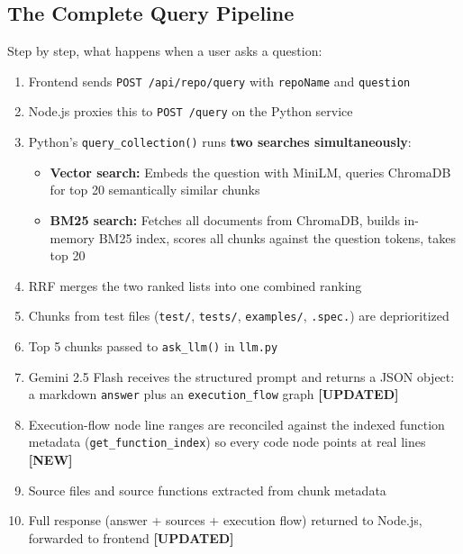 \documentclass[a4paper,11pt]{article}
\begin{document}
\subsection{The Complete Query Pipeline}

Step by step, what happens when a user asks a question:

\begin{enumerate}
    \item Frontend sends \texttt{POST /api/repo/query} with \texttt{repoName} and \texttt{question}
    \item Node.js proxies this to \texttt{POST /query} on the Python service
    \item Python's \texttt{query\_collection()} runs \textbf{two searches simultaneously}:
    \begin{itemize}
        \item \textbf{Vector search:} Embeds the question with MiniLM, queries ChromaDB for top 20 semantically similar chunks
        \item \textbf{BM25 search:} Fetches all documents from ChromaDB, builds in-memory BM25 index, scores all chunks against the question tokens, takes top 20
    \end{itemize}
    \item RRF merges the two ranked lists into one combined ranking
    \item Chunks from test files (\texttt{test/}, \texttt{tests/}, \texttt{examples/}, \texttt{.spec.}) are deprioritized
    \item Top 5 chunks passed to \texttt{ask\_llm()} in \texttt{llm.py}
    \item Gemini 2.5 Flash receives the structured prompt and returns a JSON object: a markdown \texttt{answer} plus an \texttt{execution\_flow} graph \textbf{[UPDATED]}
    \item Execution-flow node line ranges are reconciled against the indexed function metadata (\texttt{get\_function\_index}) so every code node points at real lines \textbf{[NEW]}
    \item Source files and source functions extracted from chunk metadata
    \item Full response (answer + sources + execution flow) returned to Node.js, forwarded to frontend \textbf{[UPDATED]}
\end{enumerate}

\newpage

\end{document}
